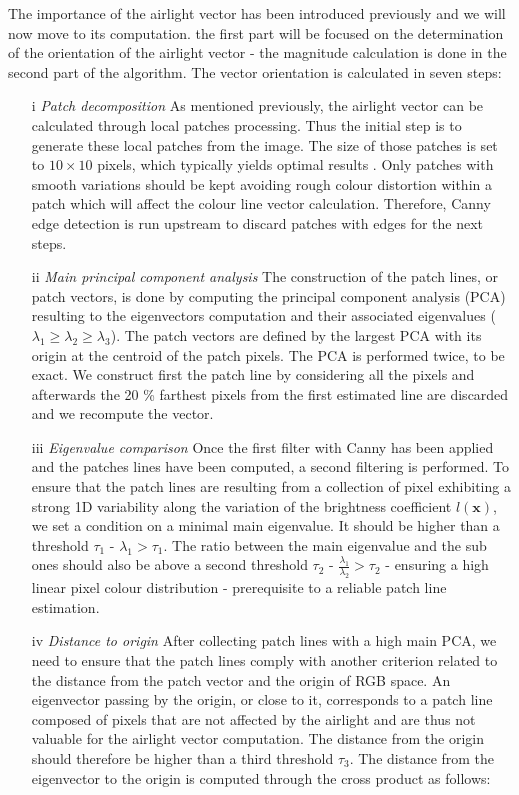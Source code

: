 \documentclass[conference]{IEEEtran}
\begin{document}
The importance of the airlight vector has been introduced previously and we will now move to its computation.
the first part will be focused on the determination of the orientation of the airlight vector - the magnitude calculation is done 
in the second part of the algorithm. The vector orientation is calculated in seven steps:
\begin{itemize}[]
\item[i] \textit{Patch decomposition} As mentioned previously, the airlight vector can be calculated through local patches processing. 
Thus the initial step is to generate these local patches from the image. The size of those patches is set to $10 \times 10$ pixels, which typically yields optimal results \cite{airlight}. Only patches with smooth variations
should be kept avoiding rough colour distortion within a patch which will affect the colour line vector calculation.  Therefore, Canny
edge detection is run upstream to discard patches with edges for the next steps.
\item[ii] \textit{Main principal component analysis} The construction of the patch lines, or patch vectors, is done by computing the principal component analysis (PCA) resulting to the eigenvectors computation and their
associated eigenvalues ($\lambda_1 \geq \lambda_2 \geq \lambda_3$).  The patch vectors are defined by the largest PCA with its origin at the centroid of the patch pixels.
The PCA is performed twice, to be exact. We construct first the patch line by considering all the pixels and afterwards the 20 \% farthest
pixels from the first estimated line are discarded and we recompute the vector.  
\item[iii] \textit{Eigenvalue comparison} Once the first filter with Canny has been applied and the patches lines have been computed, 
a second filtering is performed.  To ensure that the patch lines are resulting from a collection of pixel exhibiting a strong 1D variability 
along the variation of the brightness coefficient $l(\mathbf{x})$, we set a condition on a minimal main eigenvalue.
It should be higher than a threshold $\tau_1$ - $\lambda_1 > \tau_1$. 
The ratio between the main eigenvalue and the sub ones should also be above a second threshold $\tau_2$ - $\frac{\lambda_1}{\lambda_2} > \tau_2$ - 
ensuring a high linear pixel colour distribution - prerequisite to a reliable patch line estimation.
\item[iv] \textit{Distance to origin} After collecting patch lines with a high main PCA, we need to ensure that the patch lines 
comply with another criterion related to the distance from the patch vector and the origin of RGB space. 
An eigenvector passing by the origin, or close to it, corresponds to a patch line composed of pixels that are not affected by the airlight and are thus not valuable for the airlight vector computation.
The distance from the origin should therefore be higher than a third threshold $\tau_3$.  The distance from the eigenvector to the origin
is computed through the cross product as follows:


\end{itemize}
\end{document}
